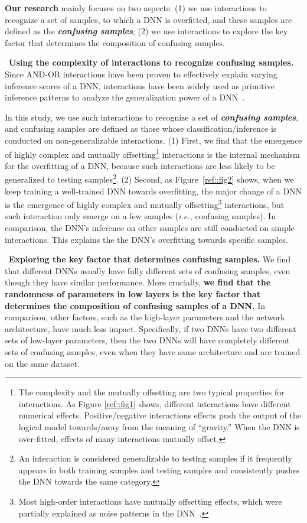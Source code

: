 \documentclass[10pt,twocolumn,letterpaper]{article}
\begin{document}
\textbf{Our research} mainly focuses on two aspects: (1) we use interactions to recognize a set of samples, to which a DNN is overfitted, and these samples are defined as the \textbf{\textit{confusing samples}}; (2) we use interactions to explore the key factor that determines the composition of confusing samples.


\textbullet \ \textbf{Using the complexity of interactions to recognize confusing samples.} Since AND-OR interactions have been proven to effectively explain varying inference scores of a DNN, interactions have been widely used as primitive inference patterns to analyze the generalization power of a DNN~\citep{zhou2024explaining, deng2022discovering}.

In this study, we use such interactions to recognize a set of \textbf{\textit{confusing samples}},  and confusing samples are defined as those whose classification/inference is conducted on non-generalizable interactions. (1) First, we find that the emergence of highly complex and mutually offsetting\footnote[1]{The complexity and the mutually offsetting are two typical properties for interactions. As Figure \ref{ref::fig1} shows, different interactions have different numerical effects. Positive/negative interactions effects push the output of the logical model towards/away from the meaning of ``gravity.'' When the DNN is over-fitted, effects of many interactions mutually offset. } interactions is the internal mechanism for the overfitting of a DNN, because such interactions are less likely to be generalized to testing samples\footnote[2]{
An interaction is considered generalizable to testing samples if it frequently appears in both training samples and testing samples and consistently pushes the DNN towards the same category.}. (2) Second, as Figure~\ref{ref::fig2} shows, when we keep training a well-trained DNN towards overfitting, the major change of a DNN is the emergence of highly complex and mutually offsetting\footnote[3]{\label{footnote-two-phase}Most high-order interactions have mutually offsetting effects, which were partially explained as noise patterns in the DNN~\cite{zhang2024two}.} interactions, but such interaction only emerge on a few samples (\emph{i.e.,} confusing samples). In comparison, the DNN's inference on other samples are still conducted on simple interactions. This explains the the DNN's overfitting towards specific samples.

\textbullet \ \textbf{Exploring the key factor that determines confusing samples.} We find that different DNNs usually have fully different sets of confusing samples, even though they have similar performance. More crucially, \textbf{we find that the randomness of parameters in low layers is the key factor that determines the composition of confusing samples of a DNN.} In comparison, other factors, such as the high-layer parameters and the network architecture, have much less impact. Specifically, if two DNNs have two different sets of low-layer parameters, then the two DNNs will have completely different sets of confusing samples, even when they have same architecture and are trained on the same dataset.
\end{document}
